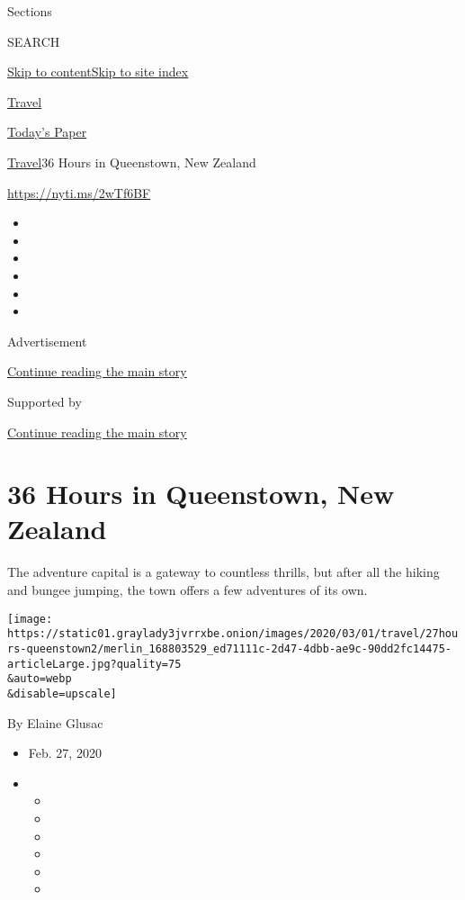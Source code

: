 Sections

SEARCH

\protect\hyperlink{site-content}{Skip to
content}\protect\hyperlink{site-index}{Skip to site index}

\href{https://www.nytimes3xbfgragh.onion/section/travel}{Travel}

\href{https://myaccount.nytimes3xbfgragh.onion/auth/login?response_type=cookie\&client_id=vi}{}

\href{https://www.nytimes3xbfgragh.onion/section/todayspaper}{Today's
Paper}

\href{/section/travel}{Travel}\textbar{}36 Hours in Queenstown, New
Zealand

\url{https://nyti.ms/2wTf6BF}

\begin{itemize}
\item
\item
\item
\item
\item
\item
\end{itemize}

Advertisement

\protect\hyperlink{after-top}{Continue reading the main story}

Supported by

\protect\hyperlink{after-sponsor}{Continue reading the main story}

\hypertarget{36-hours-in-queenstown-new-zealand}{%
\section{36 Hours in Queenstown, New
Zealand}\label{36-hours-in-queenstown-new-zealand}}

The adventure capital is a gateway to countless thrills, but after all
the hiking and bungee jumping, the town offers a few adventures of its
own.

\texttt{[image: https://static01.graylady3jvrrxbe.onion/images/2020/03/01/travel/27hours-queenstown2/merlin\_168803529\_ed71111c-2d47-4dbb-ae9c-90dd2fc14475-articleLarge.jpg?quality=75\\\&auto=webp\\\&disable=upscale]}

By Elaine Glusac

\begin{itemize}
\item
  Feb. 27, 2020
\item
  \begin{itemize}
  \item
  \item
  \item
  \item
  \item
  \item
  \end{itemize}
\end{itemize}

